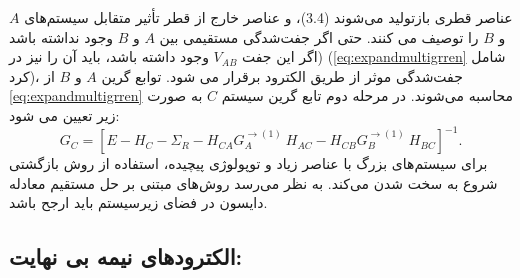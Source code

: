 عناصر قطری بازتولید می‌شوند (3.4)، و عناصر خارج از قطر تأثیر متقابل سیستم‌های $A$ و $B$ را توصیف می کنند. حتی اگر جفت‌شدگی مستقیمی بین $A$ و $B$ وجود نداشته باشد (اگر این جفت $V_{AB}$ وجود داشته باشد، باید آن را نیز در (\ref{eq:expandmultigrren} شامل کرد)، جفت‌شدگی موثر از طریق الکترود برقرار می شود.
توابع گرین $A$ و $B$ از \ref{eq:expandmultigrren} محاسبه می‌شوند. در مرحله دوم تابع گرین سیستم $C$ به صورت زیر تعیین می شود:
\begin{equation}
    {{G}_{C}}={{\left[ E-{{H}_{C}}-{{\Sigma }_{R}}-{{H}_{CA}}G_{A}^{\to (1)}\ {{H}_{AC}}-{{H}_{CB}}G_{B}^{\to (1)}\ {{H}_{BC}} \right]}^{-1}}.
\end{equation}
برای سیستم‌های بزرگ با عناصر زیاد و توپولوژی پیچیده، استفاده از روش بازگشتی شروع به سخت شدن می‌کند. به نظر می‌رسد روش‌های مبتنی بر حل مستقیم معادله دایسون در فضای زیرسیستم باید ارجح باشد. 

\subsection{الکترودهای نیمه بی نهایت:}
